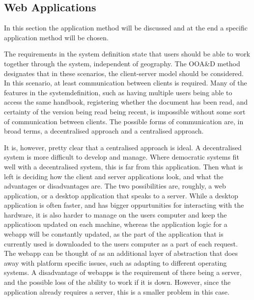 \subsection{Web Applications}
In this section the application method will be discussed and at the end a specific application method will be chosen.

The requirements in the system definition state that users should be able to work together through the system, independent of geography.
The OOA\&D method designates that in these scenarios, the client-server model should be considered.
In this scenario, at least communication between clients is required. Many of the features in the systemdefinition, such as having multiple users being able to access the same handbook, registering whether the document has been read, and certainty of the version being read being recent, is impossible without some sort of communication between clients. The possible forms of communication are, in broad terms, a decentralised approach and a centralised approach.

It is, however, pretty clear that a centralised approach is ideal. A decentralised system is more difficult to develop and manage. Where democratic systems fit well with a decentralised system, this is far from this application.
Then what is left is deciding how the client and server applications look, and what the advantages or disadvantages are. The two possibilities are, roughly, a web application, or a desktop application that speaks to a server. While a desktop application is often faster, and has bigger oppurtunities for interacting with the hardware, it is also harder to manage on the users computer and keep the applicatioon updated on each machine, whereas the application logic for a webapp will be constantly updated, as the part of the application that is currently used is downloaded to the users computer as a part of each request. The webapp can be thought of as an additional layer of abstraction that does away with platform specific issues, such as adapting to different operating systems. A disadvantage of webapps is the requirement of there being a server, and the possible loss of the ability to work if it is down. However, since the application already requires a server, this is a smaller problem in this case.

